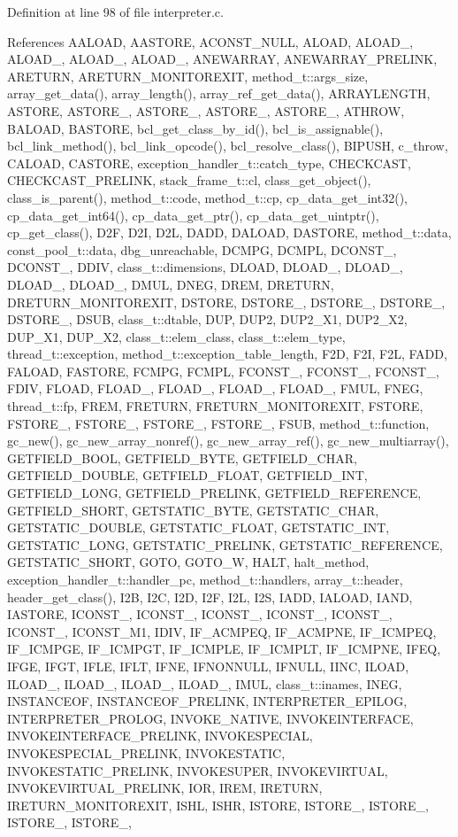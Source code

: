Definition at line 98 of file interpreter.c.



References AALOAD, AASTORE, ACONST\_\-NULL, ALOAD, ALOAD\_, ALOAD\_, ALOAD\_, ALOAD\_, ANEWARRAY, ANEWARRAY\_\-PRELINK, ARETURN, ARETURN\_\-MONITOREXIT, method\_\-t::args\_\-size, array\_\-get\_\-data(), array\_\-length(), array\_\-ref\_\-get\_\-data(), ARRAYLENGTH, ASTORE, ASTORE\_, ASTORE\_, ASTORE\_, ASTORE\_, ATHROW, BALOAD, BASTORE, bcl\_\-get\_\-class\_\-by\_\-id(), bcl\_\-is\_\-assignable(), bcl\_\-link\_\-method(), bcl\_\-link\_\-opcode(), bcl\_\-resolve\_\-class(), BIPUSH, c\_\-throw, CALOAD, CASTORE, exception\_\-handler\_\-t::catch\_\-type, CHECKCAST, CHECKCAST\_\-PRELINK, stack\_\-frame\_\-t::cl, class\_\-get\_\-object(), class\_\-is\_\-parent(), method\_\-t::code, method\_\-t::cp, cp\_\-data\_\-get\_\-int32(), cp\_\-data\_\-get\_\-int64(), cp\_\-data\_\-get\_\-ptr(), cp\_\-data\_\-get\_\-uintptr(), cp\_\-get\_\-class(), D2F, D2I, D2L, DADD, DALOAD, DASTORE, method\_\-t::data, const\_\-pool\_\-t::data, dbg\_\-unreachable, DCMPG, DCMPL, DCONST\_, DCONST\_, DDIV, class\_\-t::dimensions, DLOAD, DLOAD\_, DLOAD\_, DLOAD\_, DLOAD\_, DMUL, DNEG, DREM, DRETURN, DRETURN\_\-MONITOREXIT, DSTORE, DSTORE\_, DSTORE\_, DSTORE\_, DSTORE\_, DSUB, class\_\-t::dtable, DUP, DUP2, DUP2\_\-X1, DUP2\_\-X2, DUP\_\-X1, DUP\_\-X2, class\_\-t::elem\_\-class, class\_\-t::elem\_\-type, thread\_\-t::exception, method\_\-t::exception\_\-table\_\-length, F2D, F2I, F2L, FADD, FALOAD, FASTORE, FCMPG, FCMPL, FCONST\_, FCONST\_, FCONST\_, FDIV, FLOAD, FLOAD\_, FLOAD\_, FLOAD\_, FLOAD\_, FMUL, FNEG, thread\_\-t::fp, FREM, FRETURN, FRETURN\_\-MONITOREXIT, FSTORE, FSTORE\_, FSTORE\_, FSTORE\_, FSTORE\_, FSUB, method\_\-t::function, gc\_\-new(), gc\_\-new\_\-array\_\-nonref(), gc\_\-new\_\-array\_\-ref(), gc\_\-new\_\-multiarray(), GETFIELD\_\-BOOL, GETFIELD\_\-BYTE, GETFIELD\_\-CHAR, GETFIELD\_\-DOUBLE, GETFIELD\_\-FLOAT, GETFIELD\_\-INT, GETFIELD\_\-LONG, GETFIELD\_\-PRELINK, GETFIELD\_\-REFERENCE, GETFIELD\_\-SHORT, GETSTATIC\_\-BYTE, GETSTATIC\_\-CHAR, GETSTATIC\_\-DOUBLE, GETSTATIC\_\-FLOAT, GETSTATIC\_\-INT, GETSTATIC\_\-LONG, GETSTATIC\_\-PRELINK, GETSTATIC\_\-REFERENCE, GETSTATIC\_\-SHORT, GOTO, GOTO\_\-W, HALT, halt\_\-method, exception\_\-handler\_\-t::handler\_\-pc, method\_\-t::handlers, array\_\-t::header, header\_\-get\_\-class(), I2B, I2C, I2D, I2F, I2L, I2S, IADD, IALOAD, IAND, IASTORE, ICONST\_, ICONST\_, ICONST\_, ICONST\_, ICONST\_, ICONST\_, ICONST\_\-M1, IDIV, IF\_\-ACMPEQ, IF\_\-ACMPNE, IF\_\-ICMPEQ, IF\_\-ICMPGE, IF\_\-ICMPGT, IF\_\-ICMPLE, IF\_\-ICMPLT, IF\_\-ICMPNE, IFEQ, IFGE, IFGT, IFLE, IFLT, IFNE, IFNONNULL, IFNULL, IINC, ILOAD, ILOAD\_, ILOAD\_, ILOAD\_, ILOAD\_, IMUL, class\_\-t::inames, INEG, INSTANCEOF, INSTANCEOF\_\-PRELINK, INTERPRETER\_\-EPILOG, INTERPRETER\_\-PROLOG, INVOKE\_\-NATIVE, INVOKEINTERFACE, INVOKEINTERFACE\_\-PRELINK, INVOKESPECIAL, INVOKESPECIAL\_\-PRELINK, INVOKESTATIC, INVOKESTATIC\_\-PRELINK, INVOKESUPER, INVOKEVIRTUAL, INVOKEVIRTUAL\_\-PRELINK, IOR, IREM, IRETURN, IRETURN\_\-MONITOREXIT, ISHL, ISHR, ISTORE, ISTORE\_, ISTORE\_, ISTORE\_, ISTORE\_, 